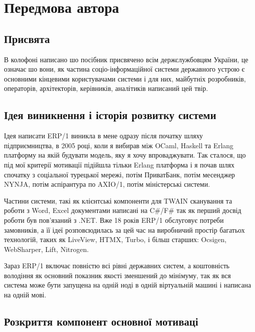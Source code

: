 \chapter*{Передмова автора}

\section*{Присвята}

В колофоні написано шо посібник присвячено всім держслужбовцям України,
це означає шо вони, як частина соціо-інформаційної системи державного устрою
є основними кінцевими користувачами системи і для них, майбутніх розробників,
операторів, архітекторів, керівників, аналітиків написаний цей твір.

\section*{Ідея виникнення і історія розвитку системи}

Ідея написати ERP/1 виникла в мене одразу після початку шляху
підприємництва, в 2005 році, коли я вибирав між OCaml, Haskell та Erlang платформу
на якій будувати модель, яку я хочу впроваджувати. Так сталося, що під мої
критерії мотивації підійшла тільки Erlang платформа і я почав шлях
спочатку з соціальної турецької мережі, потім ПриватБанк, потім месенджер NYNJA,
потім аспірантура по AXIO/1, потім міністерські системи.

Частини системи, такі як клієнтські компоненти для TWAIN сканування та роботи з Word, Excel
документами написані на C\#/F\# так як перший досвід роботи був пов'язаний з .NET.
Вже 18 років ERP/1 обслуговує потреби замовників, а її ідеї розповсюдилась за цей час
на виробничий простір багатьох технологій, таких як LiveView, HTMX, Turbo, і більш старших:
Ocsigen, WebSharper, Lift, Nitrogen.

Зараз ERP/1 включає повністю всі рівні державних систем, а коштовність
володіння як основний показник якості зменшений до мінімуму, так як вся система
може бути запущена на одній ноді в одній віртуальній машині і написана на одній мові.

\newpage
\section*{Розкриття компонент основної мотиваці}

